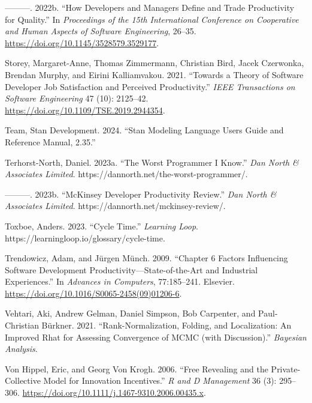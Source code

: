 \documentclass[
]{article}
\newlength{\cslhangindent}
\newenvironment{CSLReferences}[2] %
 {\begin{list}{}{%
  \setlength{\itemindent}{0pt}
  \setlength{\leftmargin}{0pt}
  \setlength{\parsep}{0pt}
  \ifodd #1
   \setlength{\leftmargin}{\cslhangindent}
   \setlength{\itemindent}{-1\cslhangindent}
  \fi
  \setlength{\itemsep}{#2\baselineskip}}}
 {\end{list}}
\begin{document}
\begin{CSLReferences}{1}{0}
---------. 2022b. {``How {Developers} and {Managers Define} and {Trade
Productivity} for {Quality}.''} In \emph{Proceedings of the 15th
{International Conference} on {Cooperative} and {Human Aspects} of
{Software Engineering}}, 26--35.
\url{https://doi.org/10.1145/3528579.3529177}.

Storey, Margaret-Anne, Thomas Zimmermann, Christian Bird, Jacek
Czerwonka, Brendan Murphy, and Eirini Kalliamvakou. 2021. {``Towards a
{Theory} of {Software Developer Job Satisfaction} and {Perceived
Productivity}.''} \emph{IEEE Transactions on Software Engineering} 47
(10): 2125--42. \url{https://doi.org/10.1109/TSE.2019.2944354}.

Team, Stan Development. 2024. {``Stan {Modeling Language Users Guide}
and {Reference Manual}, 2.35.''}

Terhorst-North, Daniel. 2023a. {``The {Worst Programmer I Know}.''}
\emph{Dan North \& Associates Limited}.
https://dannorth.net/the-worst-programmer/.

---------. 2023b. {``{McKinsey Developer Productivity Review}.''}
\emph{Dan North \& Associates Limited}.
https://dannorth.net/mckinsey-review/.

Toxboe, Anders. 2023. {``Cycle {Time}.''} \emph{Learning Loop}.
https://learningloop.io/glossary/cycle-time.

Trendowicz, Adam, and Jürgen Münch. 2009. {``Chapter 6 {Factors
Influencing Software Development Productivity}---{State}-of-the-{Art}
and {Industrial Experiences}.''} In \emph{Advances in {Computers}},
77:185--241. Elsevier.
\url{https://doi.org/10.1016/S0065-2458(09)01206-6}.

Vehtari, Aki, Andrew Gelman, Daniel Simpson, Bob Carpenter, and
Paul-Christian Bürkner. 2021. {``Rank-Normalization, Folding, and
Localization: {An} Improved {Rhat} for Assessing Convergence of {MCMC}
(with Discussion).''} \emph{Bayesian Analysis}.

Von Hippel, Eric, and Georg Von Krogh. 2006. {``Free Revealing and the
Private-Collective Model for Innovation Incentives.''} \emph{R and D
Management} 36 (3): 295--306.
\url{https://doi.org/10.1111/j.1467-9310.2006.00435.x}.


\end{CSLReferences}
\end{document}
